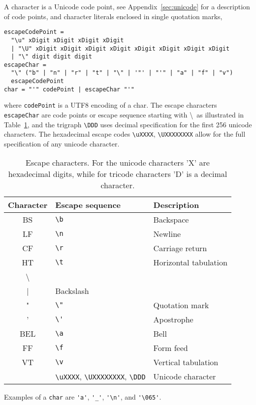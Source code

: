 A character is a Unicode code point, see Appendix~\ref{sec:unicode} for a description of code points, and character literals enclosed in single quotation marks,
%
\begin{lstlisting}[language=EBNF]
escapeCodePoint = 
  "\u" xDigit xDigit xDigit xDigit
  | "\U" xDigit xDigit xDigit xDigit xDigit xDigit xDigit xDigit
  | "\" digit digit digit 
escapeChar = 
  "\" ("b" | "n" | "r" | "t" | "\" | '"' | "'" | "a" | "f" | "v")
  escapeCodePoint
char = "'" codePoint | escapeChar "'"
\end{lstlisting}
% 
where \lstinline[language=EBNF]!codePoint! is a UTF8 encoding of a char. The escape characters \lstinline[language=EBNF]{escapeChar} are code points or escape sequence starting with \textbackslash\ as illustrated in Table~\ref{tab:escapeChar}, and the trigraph \lstinline|\DDD| uses decimal specification for the first 256 unicode characters. The hexadecimal escape codes \lstinline|\uXXXX|, \lstinline|\UXXXXXXXX| allow for the full specification of any unicode character.
\begin{table}
  \centering
  \begin{tabular}{|c|l|l|}
    \hline
    Character& Escape sequence & Description\\
    \hline
    BS &\lstinline|\b|& Backspace\\
    LF &\lstinline|\n|&Newline\\
    CF &\lstinline|\r|&Carriage return\\
    HT &\lstinline|\t|&Horizontal tabulation\\
    \textbackslash &\lstinline|\\|&Backslash\\
     " &\lstinline|\"|&Quotation mark\\
    ' &\lstinline|\'|&Apostrophe\\
    BEL&\lstinline|\a|& Bell\\
    FF&\lstinline|\f|&Form feed\\
    VT &\lstinline|\v|&Vertical tabulation\\
    &\lstinline|\uXXXX|, \lstinline|\UXXXXXXXX|, \lstinline|\DDD|&Unicode character\\
    \hline
  \end{tabular}
  \caption{Escape characters. For the unicode characters 'X' are hexadecimal digits, while for tricode characters 'D' is a decimal character.}
  \label{tab:escapeChar}
\end{table}
Examples of a \lstinline[language=ebnf]!char! are \lstinline{'a'}, \lstinline{'_'}, \lstinline{'\n'}, and \lstinline{'\065'}.

